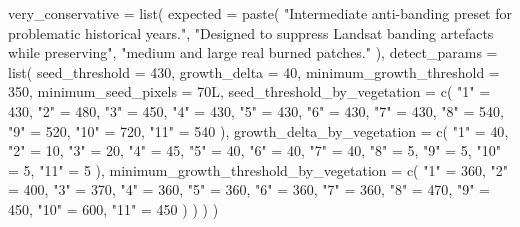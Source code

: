 \documentclass[
  british,
  a4paper,
]{scrbook}
\newenvironment{Shaded}{\begin{snugshade}}{\end{snugshade}}
\newcommand{\AttributeTok}[1]{\textcolor[rgb]{0.40,0.45,0.13}{#1}}
\newcommand{\DecValTok}[1]{\textcolor[rgb]{0.68,0.00,0.00}{#1}}
\newcommand{\FunctionTok}[1]{\textcolor[rgb]{0.28,0.35,0.67}{#1}}
\newcommand{\NormalTok}[1]{\textcolor[rgb]{0.00,0.23,0.31}{#1}}
\newcommand{\OtherTok}[1]{\textcolor[rgb]{0.00,0.23,0.31}{#1}}
\newcommand{\StringTok}[1]{\textcolor[rgb]{0.13,0.47,0.30}{#1}}
\begin{document}
\begin{Shaded}
\begin{Highlighting}[]
  \AttributeTok{very\_conservative =} \FunctionTok{list}\NormalTok{(}
    \AttributeTok{expected =} \FunctionTok{paste}\NormalTok{(}
      \StringTok{"Intermediate anti{-}banding preset for problematic historical years."}\NormalTok{,}
      \StringTok{"Designed to suppress Landsat banding artefacts while preserving"}\NormalTok{,}
      \StringTok{"medium and large real burned patches."}
\NormalTok{    ),}
    \AttributeTok{detect\_params =} \FunctionTok{list}\NormalTok{(}
      \AttributeTok{seed\_threshold =} \DecValTok{430}\NormalTok{,}
      \AttributeTok{growth\_delta =} \DecValTok{40}\NormalTok{,}
      \AttributeTok{minimum\_growth\_threshold =} \DecValTok{350}\NormalTok{,}
      \AttributeTok{minimum\_seed\_pixels =} \DecValTok{70}\NormalTok{L,}
      \AttributeTok{seed\_threshold\_by\_vegetation =} \FunctionTok{c}\NormalTok{(}
        \StringTok{"1"} \OtherTok{=} \DecValTok{430}\NormalTok{, }\StringTok{"2"} \OtherTok{=} \DecValTok{480}\NormalTok{, }\StringTok{"3"} \OtherTok{=} \DecValTok{450}\NormalTok{, }\StringTok{"4"} \OtherTok{=} \DecValTok{430}\NormalTok{, }\StringTok{"5"} \OtherTok{=} \DecValTok{430}\NormalTok{,}
        \StringTok{"6"} \OtherTok{=} \DecValTok{430}\NormalTok{, }\StringTok{"7"} \OtherTok{=} \DecValTok{430}\NormalTok{, }\StringTok{"8"} \OtherTok{=} \DecValTok{540}\NormalTok{, }\StringTok{"9"} \OtherTok{=} \DecValTok{520}\NormalTok{, }\StringTok{"10"} \OtherTok{=} \DecValTok{720}\NormalTok{, }\StringTok{"11"} \OtherTok{=} \DecValTok{540}
\NormalTok{      ),}
      \AttributeTok{growth\_delta\_by\_vegetation =} \FunctionTok{c}\NormalTok{(}
        \StringTok{"1"} \OtherTok{=} \DecValTok{40}\NormalTok{, }\StringTok{"2"} \OtherTok{=} \DecValTok{10}\NormalTok{, }\StringTok{"3"} \OtherTok{=} \DecValTok{20}\NormalTok{, }\StringTok{"4"} \OtherTok{=} \DecValTok{45}\NormalTok{, }\StringTok{"5"} \OtherTok{=} \DecValTok{40}\NormalTok{,}
        \StringTok{"6"} \OtherTok{=} \DecValTok{40}\NormalTok{, }\StringTok{"7"} \OtherTok{=} \DecValTok{40}\NormalTok{, }\StringTok{"8"} \OtherTok{=} \DecValTok{5}\NormalTok{, }\StringTok{"9"} \OtherTok{=} \DecValTok{5}\NormalTok{, }\StringTok{"10"} \OtherTok{=} \DecValTok{5}\NormalTok{, }\StringTok{"11"} \OtherTok{=} \DecValTok{5}
\NormalTok{      ),}
      \AttributeTok{minimum\_growth\_threshold\_by\_vegetation =} \FunctionTok{c}\NormalTok{(}
        \StringTok{"1"} \OtherTok{=} \DecValTok{360}\NormalTok{, }\StringTok{"2"} \OtherTok{=} \DecValTok{400}\NormalTok{, }\StringTok{"3"} \OtherTok{=} \DecValTok{370}\NormalTok{, }\StringTok{"4"} \OtherTok{=} \DecValTok{360}\NormalTok{, }\StringTok{"5"} \OtherTok{=} \DecValTok{360}\NormalTok{,}
        \StringTok{"6"} \OtherTok{=} \DecValTok{360}\NormalTok{, }\StringTok{"7"} \OtherTok{=} \DecValTok{360}\NormalTok{, }\StringTok{"8"} \OtherTok{=} \DecValTok{470}\NormalTok{, }\StringTok{"9"} \OtherTok{=} \DecValTok{450}\NormalTok{, }\StringTok{"10"} \OtherTok{=} \DecValTok{600}\NormalTok{, }\StringTok{"11"} \OtherTok{=} \DecValTok{450}
\NormalTok{      )}
\NormalTok{    )}
\NormalTok{  )}
\NormalTok{)}


\end{Highlighting}
\end{Shaded}
\end{document}
